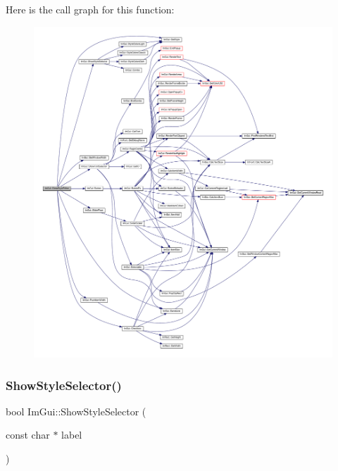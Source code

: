 Here is the call graph for this function\+:
\nopagebreak
\begin{figure}[H]
\begin{center}
\leavevmode
\includegraphics[width=350pt]{namespace_im_gui_ab2eb3dec78d054fe3feab1c091ec5de5_cgraph}
\end{center}
\end{figure}
\mbox{\label{namespace_im_gui_a83f4e863c102b0a05e0e3308b371b394}} 
\subsubsection{\texorpdfstring{Show\+Style\+Selector()}{ShowStyleSelector()}}
{\footnotesize\ttfamily bool Im\+Gui\+::\+Show\+Style\+Selector (\begin{DoxyParamCaption}\item[{const char $\ast$}]{label }\end{DoxyParamCaption})}

